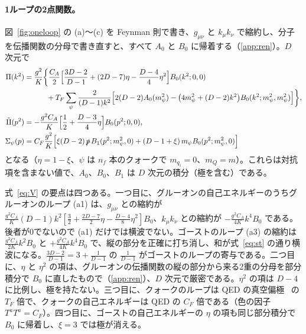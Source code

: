 \documentclass[a4paper,10pt]{ltjsarticle}
\begin{document}
\paragraph{1ループの2点関数。}図~\ref{fig:oneloop} の (a)〜(c) を Feynman 則で書き、$g_{\mu\nu}$ と $k_\mu k_\nu$ で縮約し、分子を伝播関数の分母で書き直すと、すべて $A_0$ と $B_0$ に帰着する（\ref{app:ren}）。$D$ 次元で
\begin{equation}
\begin{aligned}
\Pi(k^2)&=\frac{g^2}{K}\biggl\{\frac{C_A}{2}\Bigl[\frac{3D-2}{D-1}+(2D-7)\eta-\frac{D-4}{4}\eta^2\Bigr]B_0(k^2;0,0)\\
&\hspace{3em}+T_F\sum_{\psi}\frac{2}{(D-1)k^2}\Bigl[2(D-2)A_0(m_\psi^2)-\bigl(4m_\psi^2+(D-2)k^2\bigr)B_0(k^2;m_\psi^2,m_\psi^2)\Bigr]\biggr\},\\
\tilde\Pi(p^2)&=-\frac{g^2C_A}{K}\Bigl[\frac12+\frac{D-3}{4}\eta\Bigr]B_0(p^2;0,0),\\
\Sigma_\psi(p)&=C_F\frac{g^2}{K}\Bigl[\xi(D-2)\,\slashed p\,B_1(p^2;m_\psi^2,0)+(D-1+\xi)\,m_\psi B_0(p^2;m_\psi^2,0)\Bigr]
\end{aligned}
\label{eq:V}
\end{equation}
となる（$\eta=1-\xi$、$\psi$ は $n_f$ 本のクォークで $m_{q_i}=0$、$m_Q=m$）。これらは対抗項を含まない値で、$A_0$、$B_0$、$B_1$ は $D$ 次元の積分（極を含む）である。

式~\eqref{eq:V} の要点は四つある。一つ目に、グルーオンの自己エネルギーのうちグルーオンのループ (a1) は、$g_{\mu\nu}$ との縮約が $\frac{g^2C_A}{K}(D-1)k^2[\frac32+\frac{2D-7}2\eta-\frac{D-4}8\eta^2]B_0$、$k_\mu k_\nu$ との縮約が $-\frac{g^2C_A}{4K}k^4B_0$ である。後者が0でないので (a1) だけでは横波でない。ゴーストのループ (a3) の縮約は $\frac{g^2C_A}{2K}k^2B_0$ と $+\frac{g^2C_A}{4K}k^4B_0$ で、縦の部分を正確に打ち消し、和が式~\eqref{eq:st} の通り横波になる。$\frac{3D-2}{D-1}=3+\frac{1}{D-1}$ の $\frac1{D-1}$ がゴーストのループの寄与である。二つ目に、$\eta$ と $\eta^2$ の項は、グルーオンの伝播関数の縦の部分から来る2重の分母を部分積分で $B_0$ に直したもので（\ref{app:ren}）、$D$ 次元で厳密である。$\eta^2$ の項は $D-4$ に比例し、極を持たない。三つ目に、クォークのループは QED の真空偏極~\cite{qednote} の $T_F$ 倍で、クォークの自己エネルギーは QED の $C_F$ 倍である（色の因子 $T^aT^a=C_F$）。四つ目に、ゴーストの自己エネルギーの $\eta$ の項も同じ部分積分で $B_0$ に帰着し、$\xi=3$ では極が消える。
\end{document}
